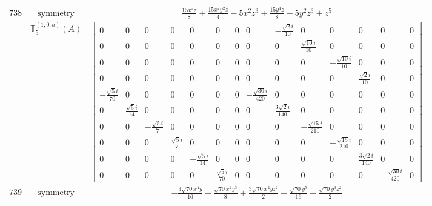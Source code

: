 \documentclass[fleqn,8pt,landscape]{jsarticle}
\begin{document}
\begin{longtable}{ccc}
$ 738 $ & $ \text{symmetry} $ & $ \frac{15 x^{4} z}{8} + \frac{15 x^{2} y^{2} z}{4} - 5 x^{2} z^{3} + \frac{15 y^{4} z}{8} - 5 y^{2} z^{3} + z^{5} $ \\
$  $ & $ \mathbb{T}_{5}^{(1,0;a)}(A) $ & $ \begin{bmatrix} 0 & 0 & 0 & 0 & 0 & 0 & 0 & 0 & - \frac{\sqrt{2} i}{10} & 0 & 0 & 0 & 0 & 0 \\ 0 & 0 & 0 & 0 & 0 & 0 & 0 & 0 & 0 & \frac{\sqrt{10} i}{10} & 0 & 0 & 0 & 0 \\ 0 & 0 & 0 & 0 & 0 & 0 & 0 & 0 & 0 & 0 & - \frac{\sqrt{10} i}{10} & 0 & 0 & 0 \\ 0 & 0 & 0 & 0 & 0 & 0 & 0 & 0 & 0 & 0 & 0 & \frac{\sqrt{2} i}{10} & 0 & 0 \\ - \frac{\sqrt{5} i}{70} & 0 & 0 & 0 & 0 & 0 & 0 & - \frac{\sqrt{30} i}{420} & 0 & 0 & 0 & 0 & 0 & 0 \\ 0 & \frac{\sqrt{5} i}{14} & 0 & 0 & 0 & 0 & 0 & 0 & \frac{3 \sqrt{2} i}{140} & 0 & 0 & 0 & 0 & 0 \\ 0 & 0 & - \frac{\sqrt{5} i}{7} & 0 & 0 & 0 & 0 & 0 & 0 & - \frac{\sqrt{15} i}{210} & 0 & 0 & 0 & 0 \\ 0 & 0 & 0 & \frac{\sqrt{5} i}{7} & 0 & 0 & 0 & 0 & 0 & 0 & - \frac{\sqrt{15} i}{210} & 0 & 0 & 0 \\ 0 & 0 & 0 & 0 & - \frac{\sqrt{5} i}{14} & 0 & 0 & 0 & 0 & 0 & 0 & \frac{3 \sqrt{2} i}{140} & 0 & 0 \\ 0 & 0 & 0 & 0 & 0 & \frac{\sqrt{5} i}{70} & 0 & 0 & 0 & 0 & 0 & 0 & - \frac{\sqrt{30} i}{420} & 0 \end{bmatrix} $ \\ \hline
$ 739 $ & $ \text{symmetry} $ & $ - \frac{3 \sqrt{70} x^{4} y}{16} - \frac{\sqrt{70} x^{2} y^{3}}{8} + \frac{3 \sqrt{70} x^{2} y z^{2}}{2} + \frac{\sqrt{70} y^{5}}{16} - \frac{\sqrt{70} y^{3} z^{2}}{2} $ \\

\end{longtable}
\end{document}
